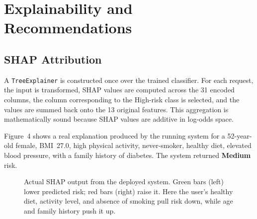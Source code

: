 \documentclass[11pt,a4paper]{article}
\begin{document}
\section{Explainability and Recommendations}

\subsection{SHAP Attribution}
A \texttt{TreeExplainer} is constructed once over the trained classifier. For
each request, the input is transformed, SHAP values are computed across the 31
encoded columns, the column corresponding to the High-risk class is selected,
and the values are summed back onto the 13 original features. This aggregation
is mathematically sound because SHAP values are additive in log-odds space.

Figure~4 shows a real explanation produced by the running system for a
52-year-old female, BMI~27.0, high physical activity, never-smoker, healthy
diet, elevated blood pressure, with a family history of diabetes. The system
returned \textbf{Medium} risk.

\begin{figure}[h!]
\centering
{}
\caption{Actual SHAP output from the deployed system. Green bars (left) lower
predicted risk; red bars (right) raise it. Here the user's healthy diet,
activity level, and absence of smoking pull risk down, while age and family
history push it up.}
\end{figure}
\end{document}
